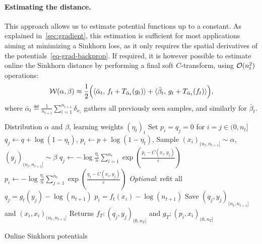 \paragraph{Estimating the distance.} 

This approach allows us to estimate potential functions up to a constant. As explained in~\autoref{sec:gradient},
this estimation is sufficient for most applications aiming at minimizing a Sinkhorn loss, as it only requires the spatial derivatives of the potentials~\eqref{eq-grad-backprop}. 
%
If required, it is however possible to estimate online the Sinkhorn distance  by performing a final soft $C$-transform, using $\Oo(n_t^2)$ operations:
\begin{equation}\label{eq-dist-est}
    \Ww(\alpha,\beta) \approx \frac{1}{2}\Big(\dotp{\bar \alpha_t}{f_t + \Ctrans{g_t}{\bar \alpha_t}}
     + \dotp{\bar \beta_t}{g_t + \Ctrans{f_t}{\bar \alpha_t}}\Big),
\end{equation}
where $\bar \alpha_t \eqdef \frac{1}{n_{t+1}}\sum_{i=1}^{n_{t+1}} \delta_{x_i}$
gathers all previously seen samples, and similarly for $\bar \beta_t$.

\begin{algorithm}[t]
    \begin{algorithmic}
    \Input Distribution $\alpha$ and $\beta$, learning weights ${(\eta_t)}_t$
    \State Set $p_i = q_j = 0$ for $i = j \in (0, n_t]$
        \For{$i = j \in (0, n_t]$}
        \State $q_j \gets q + \log(1 - \eta_t)$, $p_i \gets p + \log(1 - \eta_t)$,
        \EndFor
        \State Sample $(x_i)_{(n_t, n_{t+1}]} \sim \alpha$, $(y_j)_{(n_t, n_{t+1}]} \sim \beta$
        \For{$i = j \in (n_t, n_{t+1}]$}
            \State $q_j \gets 
            - \log \frac{\eta_t}{n} 
            \sum_{i=1}^{n_t} \exp(\frac{p_i - C(x_i, y_j)}{\varepsilon})$
            \State $p_i \gets 
            - \log \frac{\eta_t}{n} 
            \sum_{j=1}^{n_t} \exp(\frac{q_j - C(x_i, y_j)}{\varepsilon})$
        \EndFor
        \State \textit{Optional}: refit all $q_j = g_t(y_j) - \log (n_{t+1})$
        \State\hspace{2.45cm} $p_i = f_t(x_i) - \log (n_{t+1})$
        \State Save $(q_j, y_j)_{(n_t,n_{t+1}]}$ and $(x_i, x_i)_{(n_t,n_{t+1}]}$
    \EndFor
    \State Returns $f_T : (q_j, y_j)_{(0, n_T]}$ and
    $g_T : (p_i, x_i)_{(0, n_T]}$
    \end{algorithmic}
    \caption{Online Sinkhorn potentials}\label{alg:online_sinkhorn}
\end{algorithm}



